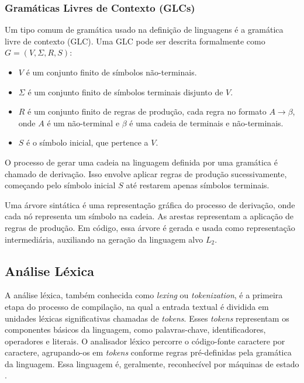 \documentclass[english, 
               brazil, 
               bsc] %
               {dcomp-abntex2}
\begin{document}
\subsubsection{Gramáticas Livres de Contexto (GLCs)}


Um tipo comum de gramática usado na definição de linguagens é a gramática livre de contexto (GLC).  Uma GLC pode ser descrita formalmente como $ G=(V,\Sigma,R,S)$:


\begin{itemize}
  \item $V$ é um conjunto finito de símbolos não-terminais.


  \item $\Sigma$ é um conjunto finito de símbolos terminais disjunto de $V$.


  \item $R$ é um conjunto finito de regras de produção, cada regra no formato $A \rightarrow \beta$, onde $A$ é um não-terminal e $\beta$ é uma cadeia de terminais e não-terminais.


  \item $S$ é o símbolo inicial, que pertence a $V$.
\end{itemize}


O processo de gerar uma cadeia na linguagem definida por uma gramática é chamado de derivação. Isso envolve aplicar regras de produção sucessivamente, começando pelo símbolo inicial $S$ até restarem apenas símbolos terminais.


Uma árvore sintática é uma representação gráfica do processo de derivação, onde cada nó representa um símbolo na cadeia. As arestas representam a aplicação de regras de produção. Em código, essa árvore é gerada e usada como representação intermediária,  auxiliando na geração da linguagem alvo $L_2$.




\subsection{Análise Léxica}
A análise léxica, também conhecida como \textit{lexing} ou \textit{tokenization}, é a primeira etapa do processo de compilação, na qual a entrada textual é dividida em unidades léxicas significativas chamadas de \textit{tokens}. Esses \textit{tokens} representam os componentes básicos da linguagem, como palavras-chave, identificadores, operadores e literais. O analisador léxico percorre o código-fonte caractere por caractere, agrupando-os em \textit{tokens} conforme regras pré-definidas pela gramática da linguagem. Essa linguagem é, geralmente, reconhecível por máquinas de estado \cite{automata}.
\end{document}
